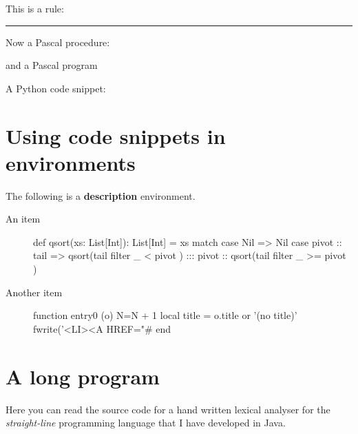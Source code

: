\documentclass[10pt,a4paper]{article}
\begin{document}
This is a rule:

\noindent\rule{\linewidth}{2pt}

Now a Pascal procedure:

and a Pascal program

A Python code snippet:


\section{Using code snippets in environments}

The following is a \textbf{description} environment.

\begin{description}
  \item[An item] \lipsum[31]
  \begin{pygmented}[lang=scala,colback=yellow,
    ]
def qsort(xs: List[Int]): List[Int] =
  xs match {
    case Nil =>
      Nil
    case pivot :: tail =>
      qsort(tail filter { _ < pivot }) :::
        pivot :: qsort(tail filter { _ >= pivot })
  }
  \end{pygmented}
  \lipsum[32]
  
  \item[Another item] \lipsum[33]
  \begin{pygmented}[lang=lua,colback=yellow]
function entry0 (o)
  N=N + 1
  local title = o.title or '(no title)'
  fwrite('<LI><A HREF="#%
end
  \end{pygmented}
  \lipsum[34]
\end{description}

\section{A long program}

Here you can read the source code for a hand written lexical analyser
for the \emph{straight-line} programming language that I have developed
in Java.

\end{document}
